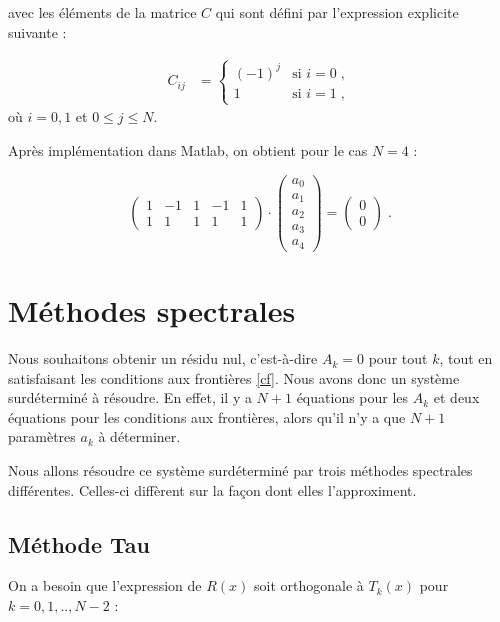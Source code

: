 \documentclass{report}
\begin{document}
avec les éléments de la matrice $C$ qui sont défini par l'expression explicite suivante :

\begin{align}
C_{ij} &= 
  \begin{cases}
    (-1)^{j} & \text{si $i=0$}\;,\\
1 & \text{si $i=1$}\;,
  \end{cases}
  \end{align}
où  $i= 0,1$ et $0 \leq j \leq N$.

Après implémentation dans Matlab, on obtient pour le cas $N=4$ :

\begin{equation}
\begin{pmatrix}
1 & -1 & 1 & -1 & 1\\ 
1 & 1 & 1 & 1 & 1
\end{pmatrix} \cdot \begin{pmatrix}
 a_0\\ 
 a_1\\ 
 a_2\\ 
 a_3\\ 
 a_4
\end{pmatrix}=\begin{pmatrix}
 0\\ 
 0
\end{pmatrix}\;.
\end{equation}

\section{Méthodes spectrales}

Nous souhaitons obtenir un résidu nul, c'est-à-dire $A_{k}=0$ pour tout $k$, tout en satisfaisant les conditions aux frontières \eqref{cf}. Nous avons donc un système surdéterminé à résoudre. En effet, il y a $N+1$ équations pour les $A_{k}$ et deux équations pour les conditions aux frontières, alors qu'il n'y a que $N+1$ paramètres $a_{k}$ à déterminer.

Nous allons résoudre ce système surdéterminé par trois méthodes spectrales différentes. Celles-ci diffèrent sur la façon dont elles l'approximent. 

\subsection{Méthode Tau}

On a besoin que l'expression de $R(x)$ soit orthogonale à $T_k(x)$ pour $k=0,1,..,N-2$ :
\end{document}
